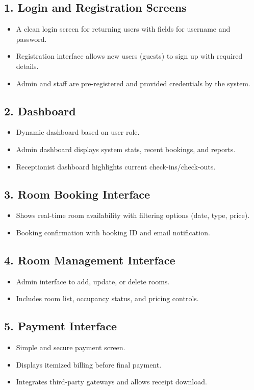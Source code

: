 \documentclass[a4paper,12pt]{article}
\begin{document}
\subsection{1. Login and Registration Screens}
\begin{itemize}
    \item A clean login screen for returning users with fields for username and password.
    \item Registration interface allows new users (guests) to sign up with required details.
    \item Admin and staff are pre-registered and provided credentials by the system.
\end{itemize}

\subsection{2. Dashboard}
\begin{itemize}
    \item Dynamic dashboard based on user role.
    \item Admin dashboard displays system stats, recent bookings, and reports.
    \item Receptionist dashboard highlights current check-ins/check-outs.
\end{itemize}

\subsection{3. Room Booking Interface}
\begin{itemize}
    \item Shows real-time room availability with filtering options (date, type, price).
    \item Booking confirmation with booking ID and email notification.
\end{itemize}

\subsection{4. Room Management Interface}
\begin{itemize}
    \item Admin interface to add, update, or delete rooms.
    \item Includes room list, occupancy status, and pricing controls.
\end{itemize}

\subsection{5. Payment Interface}
\begin{itemize}
    \item Simple and secure payment screen.
    \item Displays itemized billing before final payment.
    \item Integrates third-party gateways and allows receipt download.
\end{itemize}
\end{document}
